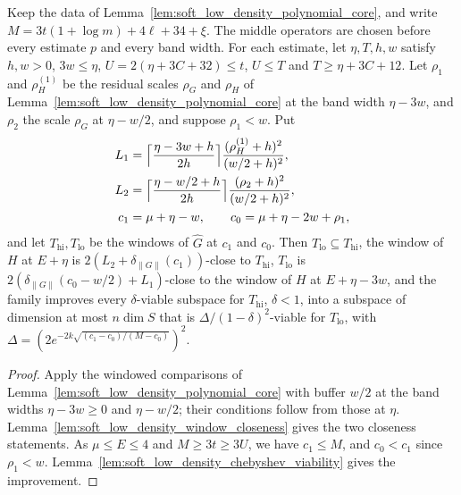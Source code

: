 \begin{lemma}
    \label{thm:efficient_soft_low_density_family}
    \leanok

    Keep the data of Lemma~\ref{lem:soft_low_density_polynomial_core}, and
    write $M=3t(1+\log m)+4\ell+34+\xi$. The middle operators are chosen
    before every estimate $p$ and every band width. For each estimate, let
    $\eta,T,h,w$ satisfy $h,w>0$, $3w\leq\eta$, $U=2(\eta+3C+32)\leq t$,
    $U\leq T$ and $T\geq\eta+3C+12$. Let $\rho_1$ and $\rho_H^{(1)}$ be the
    residual scales $\rho_G$ and $\rho_H$ of
    Lemma~\ref{lem:soft_low_density_polynomial_core} at the band width
    $\eta-3w$, and $\rho_2$ the scale $\rho_G$ at $\eta-w/2$, and suppose
    $\rho_1<w$. Put
    \begin{align}
        L_1 & =\Bigl\lceil\frac{\eta-3w+h}{2h}\Bigr\rceil\frac{(\rho_H^{(1)}+h)^2}{(w/2+h)^2}, \\
        L_2 & =\Bigl\lceil\frac{\eta-w/2+h}{2h}\Bigr\rceil\frac{(\rho_2+h)^2}{(w/2+h)^2},      \\
        c_1 & =\mu+\eta-w,\qquad c_0=\mu+\eta-2w+\rho_1,
    \end{align}
    and let $T_{\mathrm{hi}},T_{\mathrm{lo}}$ be the windows of $\widehat G$
    at $c_1$ and $c_0$. Then $T_{\mathrm{lo}}\subseteq T_{\mathrm{hi}}$, the
    window of $H$ at $E+\eta$ is $2(L_2+\delta_{\|G\|}(c_1))$-close to
    $T_{\mathrm{hi}}$, $T_{\mathrm{lo}}$ is
    $2(\delta_{\|G\|}(c_0-w/2)+L_1)$-close to the window of $H$ at
    $E+\eta-3w$, and the family improves every $\delta$-viable subspace for
    $T_{\mathrm{hi}}$, $\delta<1$, into a subspace of dimension at most
    $n\dim S$ that is $\Delta/(1-\delta)^2$-viable for $T_{\mathrm{lo}}$, with
    $\Delta=(2e^{-2k\sqrt{(c_1-c_0)/(M-c_0)}})^2$.
\end{lemma}
\begin{proof}\leanok
    Apply the windowed comparisons of
    Lemma~\ref{lem:soft_low_density_polynomial_core} with buffer $w/2$ at
    the band widths $\eta-3w\geq0$ and $\eta-w/2$; their conditions follow
    from those at $\eta$. Lemma~\ref{lem:soft_low_density_window_closeness}
    gives the two closeness statements. As $\mu\leq E\leq4$ and
    $M\geq3t\geq3U$, we have $c_1\leq M$, and $c_0<c_1$ since $\rho_1<w$.
    Lemma~\ref{lem:soft_low_density_chebyshev_viability} gives the
    improvement.
\end{proof}

